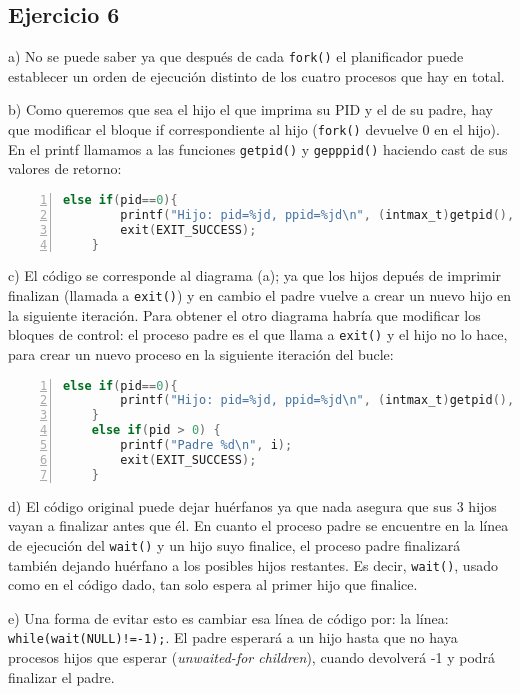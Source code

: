 \documentclass{article}
\begin{document}
\subsection*{Ejercicio 6}

a) No se puede saber ya que después de cada \texttt{fork()} el planificador puede establecer un orden de ejecución distinto de los cuatro procesos que hay en total.

b) Como queremos que sea el hijo el que imprima su PID y el de su padre, hay que modificar el bloque if correspondiente al hijo (\texttt{fork()} devuelve 0 en el hijo). En el printf llamamos a las funciones \texttt{getpid()} y \texttt{gepppid()} haciendo cast de sus valores de retorno:

\begin{lstlisting}[language=C, numbers=left]
    else if(pid==0){
        printf("Hijo: pid=%jd, ppid=%jd\n", (intmax_t)getpid(), (intmax_t)getppid());
        exit(EXIT_SUCCESS);
    }
\end{lstlisting}

c) El código se corresponde al diagrama (a); ya que los hijos depués de imprimir finalizan (llamada a \texttt{exit()}) y en cambio el padre vuelve a crear un nuevo hijo en la siguiente iteración. Para obtener el otro diagrama habría que modificar los bloques de control: el proceso padre es el que llama a \texttt{exit()} y el hijo no lo hace, para crear un nuevo proceso en la siguiente iteración del bucle:

\begin{lstlisting}[language=C, numbers=left]
    else if(pid==0){
        printf("Hijo: pid=%jd, ppid=%jd\n", (intmax_t)getpid(), (intmax_t)getppid());
    }
    else if(pid > 0) {
        printf("Padre %d\n", i);
        exit(EXIT_SUCCESS);
    }
\end{lstlisting}

d) El código original puede dejar huérfanos ya que nada asegura que sus 3 hijos vayan a finalizar antes que él. En cuanto el proceso padre se encuentre en la línea de ejecución del \texttt{wait()} y un hijo suyo finalice, el proceso padre finalizará también dejando huérfano a los posibles hijos restantes. Es decir, \texttt{wait()}, usado como en el código dado, tan solo espera al primer hijo que finalice.

e) Una forma de evitar esto es cambiar esa línea de código por: la línea: \texttt{while(wait(NULL)!=-1);}. El padre esperará a un hijo hasta que no haya procesos hijos que esperar (\textit{unwaited-for children}), cuando devolverá -1 y podrá finalizar el padre.  
\end{document}
